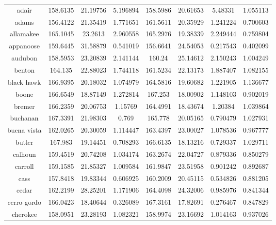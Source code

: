 \begin{table}[H]
\begin{tabular}{|c|ccc|ccc|c|}
adair         & 158.6135 & 21.19756       & 5.196894 & 158.5986 & 20.61653       & 5.48331  & 1.055113 \\
adams         & 156.4122 & 21.35419       & 1.771651 & 161.5611 & 20.35929       & 1.241224 & 0.700603 \\
allamakee     & 165.1045 & 23.2613        & 2.960558 & 165.2976 & 19.38339       & 2.249444 & 0.759804 \\
appanoose     & 159.6445 & 31.58879       & 0.541019 & 156.6641 & 24.54053       & 0.217543 & 0.402099 \\
audubon       & 158.5953 & 23.20839       & 2.141144 & 160.24   & 25.14612       & 2.150243 & 1.004249 \\
benton        & 164.135  & 22.88023       & 1.744118 & 161.5234 & 22.13173       & 1.887407 & 1.082155 \\
black hawk    & 166.9395 & 20.18032       & 1.074979 & 164.5816 & 19.60682       & 1.221905 & 1.136677 \\
boone         & 166.6549 & 18.87149       & 1.272814 & 167.253  & 18.00902       & 1.148103 & 0.902019 \\
bremer        & 166.2359 & 20.06753       & 1.15769  & 164.4991 & 18.43674       & 1.20384  & 1.039864 \\
buchanan      & 167.3391 & 21.98303       & 0.769    & 165.778  & 20.05165       & 0.790479 & 1.027931 \\
buena vista   & 162.0265 & 20.30059       & 1.114447 & 163.4397 & 23.00027       & 1.078536 & 0.967777 \\
butler        & 167.983  & 19.14451       & 0.708293 & 166.6135 & 18.13216       & 0.729337 & 1.029711 \\
calhoun       & 159.4519 & 20.74208       & 1.034174 & 163.2674 & 22.04727       & 0.879336 & 0.850279 \\
carroll       & 159.1585 & 21.85327       & 1.009584 & 161.9847 & 23.51958       & 0.901242 & 0.892687 \\
cass          & 157.8418 & 19.83344       & 0.606925 & 160.2009 & 20.45115       & 0.534826 & 0.881205 \\
cedar         & 162.2199 & 28.25201       & 1.171906 & 164.4098 & 24.32006       & 0.985976 & 0.841344 \\
cerro gordo   & 166.0423 & 18.40644       & 0.326089 & 167.3161 & 17.82691       & 0.276467 & 0.847829 \\
cherokee      & 158.0951 & 23.28193       & 1.082321 & 158.9974 & 23.16692       & 1.014163 & 0.937026 \\

\end{tabular}
\end{table}
